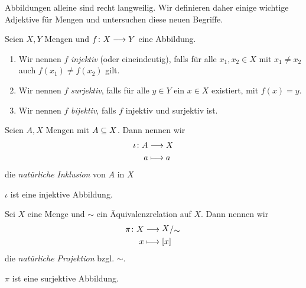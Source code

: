 
Abbildungen alleine sind recht langweilig. Wir definieren daher einige
wichtige Adjektive für Mengen und untersuchen diese neuen Begriffe.


\begin{defin}

  Seien $X,Y$ Mengen und $f\colon X \longrightarrow Y$ eine Abbildung. 
  
  \begin{enumerate}
    \item Wir nennen $f$ \emph{injektiv} (oder eineindeutig), falls
      für alle $x_{1},x_{2}\in X$ mit $x_{1} \neq x_{2}$ auch $f(x_{1}) \neq
      f(x_{2})$ gilt.
    \item Wir nennen $f$ \emph{surjektiv}, falls für alle $y\in Y$
      ein $x\in X$ existiert, mit $f(x)=y$.
    \item Wir nennen $f$ \emph{bijektiv}, falls $f$ injektiv und
      surjektiv ist.
  \end{enumerate}

\end{defin}


\begin{defin}

  Seien $A,X$ Mengen mit $A\subseteq X$. Dann nennen wir
  \begin{align*}
    \iota\colon A &\longrightarrow X \\
    a &\longmapsto a
  \end{align*}
  die \emph{natürliche Inklusion} von $A$ in $X$
\end{defin}

\begin{anm}
  $\iota$ ist eine injektive Abbildung.
\end{anm}


\begin{defin}

  Sei $X$ eine Menge und $\sim$ ein Äquivalenzrelation auf $X$. Dann nennen
  wir
  \begin{align*}
    \pi \col X &\lra \quotspace{X}{\sim} \\
    x &\lmt [x]
  \end{align*}
  die \emph{natürliche Projektion} bzgl. $\sim$.
\end{defin}


\begin{anm}

  $\pi$ ist eine surjektive Abbildung.

\end{anm}

